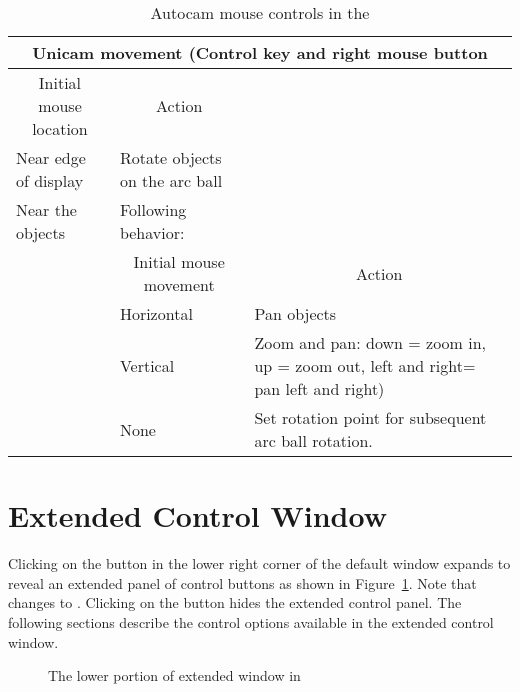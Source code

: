 \begin{table}
\begin{center}
\begin{tabular}{|l|l|p{3in}|} \hline
    \multicolumn{3}{|c|}{\large Unicam movement (Control key and right mouse
    button} \\ \hline \hline
    \multicolumn{1}{|c|}{Initial mouse location} & 
    \multicolumn{1}{|c|}{Action} & \\ 
    \hline
    Near edge of display & Rotate objects on the arc ball & \\
    Near the objects & Following behavior: & \\
    \hline
    & \multicolumn{1}{|c|}{Initial mouse movement} & 
    \multicolumn{1}{|c|}{Action}\\ \hline
    & Horizontal & Pan objects \\ 
    & Vertical & Zoom and pan: down = zoom in, up = zoom
    out, left and right= pan left and right) \\
    & None & Set rotation point for subsequent arc ball rotation.\\
    \hline
\end{tabular}
\caption{\label{tab:view-unicam} Autocam mouse controls in the \viewer{}}
\end{center}
\end{table}



\section{Extended Control Window}
\label{sec:view-control} 

Clicking on the \button{[+]} button in the lower right corner of the
default \viewer{} window expands to reveal an extended panel of
control buttons as shown in Figure~\ref{fig:extviewwindow}.  Note that
\button{[+]} changes to \button{[-]}.  Clicking on the \button{[-]}
button hides the extended control panel.  The following sections
describe the control options available in the extended control
window.

\begin{figure}[htb]
  \begin{makeimage}
  \end{makeimage}
  \extendedwindow
  \caption{\label{fig:extviewwindow} The lower portion of extended
    \viewer{} window in \SR{}} 
\end{figure}


